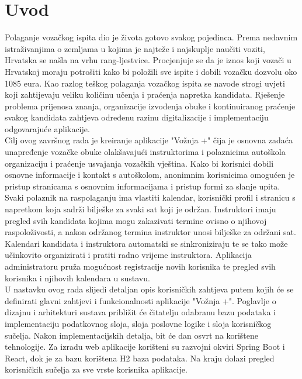 \chapter*{Uvod}
\noindent Polaganje vozačkog ispita dio je života gotovo svakog pojedinca. Prema nedavnim istraživanjima o zemljama u kojima je najteže i najskuplje naučiti voziti, Hrvatska se našla na vrhu rang-ljestvice. Procjenjuje se da je iznos koji vozači u Hrvatskoj moraju potrošiti kako bi položili sve ispite i dobili vozačku dozvolu oko 1085 eura. Kao razlog teškog polaganja vozačkog ispita se navode strogi uvjeti koji zahtijevaju veliku količinu učenja i praćenja napretka kandidata. Rješenje problema prijenosa znanja, organizacije izvođenja obuke i kontinuiranog praćenje svakog kandidata zahtjeva određenu razinu digitalizacije i implementaciju odgovarajuće aplikacije.\\

\noindent Cilj ovog završnog rada je kreiranje aplikacije "Vožnja +" čija je osnovna zadaća unapređenje vozačke obuke olakšavajući instruktorima i polaznicima autoškola  organizaciju i praćenje usvajanja vozačkih vještina. Kako bi korisnici dobili osnovne informacije i kontakt s autoškolom, anonimnim korisnicima omogućen je pristup stranicama s osnovnim informacijama i pristup formi za slanje upita. Svaki polaznik na raspolaganju ima vlastiti kalendar, korisnički profil i stranicu s napretkom koja sadrži bilješke za svaki sat koji je održan. Instruktori imaju pregled svih kandidata kojima mogu zakazivati termine ovisno o njihovoj raspoloživosti, a nakon održanog termina instruktor unosi bilješke za održani sat. Kalendari kandidata i instruktora automatski se sinkroniziraju te se tako može učinkovito organizirati i pratiti radno vrijeme instruktora. Aplikacija administratoru pruža mogućnost registracije novih korisnika te pregled svih korisnika i njihovih kalendara u sustavu. \\ 

\noindent U nastavku ovog rada slijedi detaljan opis korisničkih zahtjeva putem kojih će se definirati glavni zahtjevi i funkcionalnosti aplikacije "Vožnja +". Poglavlje o  dizajnu i arhitekturi sustava približit će čitatelju odabranu bazu podataka i implementaciju podatkovnog sloja, sloja poslovne logike i sloja korisničkog sučelja. Nakon implementacijskih detalja, bit će dan osvrt na korištene tehnologije. Za izradu web aplikacije korišteni su razvojni okviri Spring Boot i React, dok je za bazu korištena H2 baza podataka. Na kraju dolazi pregled korisničkih sučelja za sve vrste korisnika aplikacije.